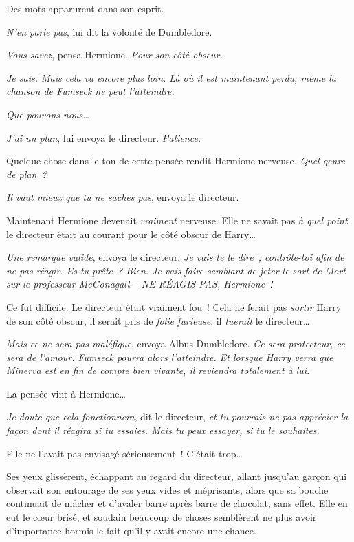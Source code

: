 Des mots apparurent dans son esprit.

\emph{N'en parle pas}, lui dit la volonté de Dumbledore.

\emph{Vous savez}, pensa Hermione.
\emph{Pour son côté obscur.}

\emph{Je sais.
Mais cela va encore plus loin.
Là où il est maintenant perdu, même la chanson de Fumseck ne peut l'atteindre.}

\emph{Que pouvons-nous…}

\emph{J'ai un plan}, lui envoya le directeur.
\emph{Patience.}

Quelque chose dans le ton de cette pensée rendit Hermione nerveuse.
\emph{Quel genre de plan~?}

\emph{Il vaut mieux que tu ne saches pas}, envoya le directeur.

Maintenant Hermione devenait \emph{vraiment} nerveuse.
Elle ne savait pas \emph{à quel point} le directeur était au courant pour le côté obscur de Harry…

\emph{Une remarque valide}, envoya le directeur.
\emph{Je vais te le dire~; contrôle-toi afin de ne pas réagir.
Es-tu prête~?
Bien. Je vais faire semblant de jeter le sort de Mort sur le professeur McGonagall -- NE RÉAGIS PAS, Hermione~!}

Ce fut difficile.
Le directeur était vraiment fou~!
Cela ne ferait pas \emph{sortir} Harry de son côté obscur, il serait pris de \emph{folie furieuse}, il \emph{tuerait} le directeur…

\emph{Mais ce ne sera pas maléfique}, envoya Albus Dumbledore.
\emph{Ce sera protecteur, ce sera de l'amour.
Fumseck pourra alors l'atteindre.
Et lorsque Harry verra que Minerva est en fin de compte bien vivante, il reviendra totalement à lui.}

La pensée vint à Hermione…

\emph{Je doute que cela fonctionnera}, dit le directeur, \emph{et tu pourrais ne pas apprécier la façon dont il réagira si tu essaies.
Mais tu peux essayer, si tu le souhaites.}

Elle ne l'avait pas envisagé sérieusement~!
C'était trop…

Ses yeux glissèrent, échappant au regard du directeur, allant jusqu'au garçon qui observait son entourage de ses yeux vides et méprisants, alors que sa bouche continuait de mâcher et d'avaler barre après barre de chocolat, sans effet.
Elle en eut le cœur brisé, et soudain beaucoup de choses semblèrent ne plus avoir d'importance hormis le fait qu'il y avait encore une chance.

